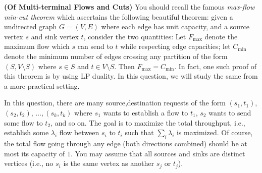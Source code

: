 \documentclass[solution,addpoints,12pt]{exam}
\begin{document}
\begin{questions}


\question[25] \textbf{(Of Multi-terminal Flows and Cuts)}
You should recall the famous \emph{max-flow min-cut theorem} which ascertains the following beautiful theorem: given a undirected graph $G = (V,E)$ where each edge has unit capacity, and a source vertex $s$ and sink vertex $t$, consider the two quantities: Let $F_{\max}$ denote the maximum flow which $s$ can send to $t$ while respecting edge capacities; let $C_{\min}$ denote the minimum number of edges crossing any partition of the form $(S,V\setminus S)$ where $s \in S$ and $t \in V \setminus S$. Then $F_{\max} = C_{\min}$. In fact, one such proof of this theorem is by using LP duality. In this question, we will study the same from a more practical setting.

In this question, there are many source,destination requests of the form $(s_1, t_1)$, $(s_2, t_2)$, $\ldots, (s_k, t_k)$ where $s_1$ wants to establish a flow to $t_1$, $s_2$ wants to send some flow to $t_2$, and so on. The goal is to maximize the total throughput, i.e., establish some $\lambda_i$ flow between $s_i$ to $t_i$ such that $\sum_{i} \lambda_i$ is maximized. Of course, the total flow going through any edge (both directions combined) should be at most its capacity of $1$. You may assume that all sources and sinks are distinct vertices (i.e., no $s_i$ is the same vertex as another $s_j$ or $t_j$).


\end{questions}
\end{document}
